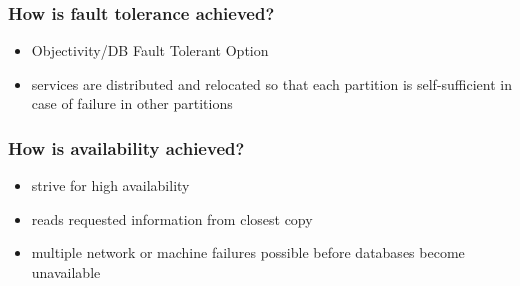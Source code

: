 \begin{frame}
\frametitle{How is fault tolerance achieved?}
\begin{itemize}
\item Objectivity/DB Fault Tolerant Option
\item services are distributed and relocated so that each partition is self-sufficient in case of  failure in other partitions
	
\end{itemize}
\end{frame} 
\begin{frame}

\frametitle{How is availability achieved?}
\begin{itemize}
\item strive for high availability 
\item reads requested information from closest copy
\item	multiple network or machine failures possible before databases become unavailable
\end{itemize}
\end{frame} 
